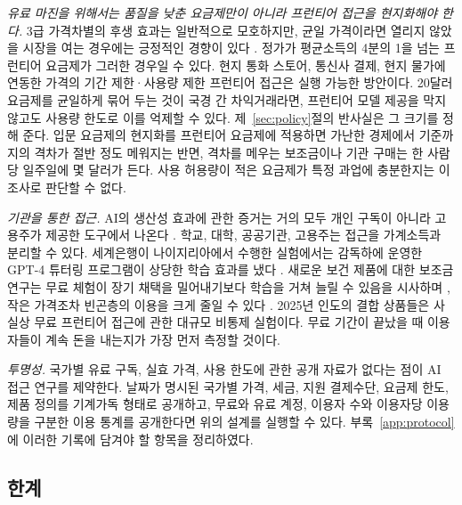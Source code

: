 \documentclass[11pt]{article}
\theoremstyle{definition}
\theoremstyle{remark}
\begin{document}
\emph{유료 마진을 위해서는 품질을 낮춘 요금제만이 아니라 프런티어 접근을 현지화해야 한다.} 3급 가격차별의 후생 효과는 일반적으로 모호하지만, 균일 가격이라면 열리지 않았을 시장을 여는 경우에는 긍정적인 경향이 있다 \citep{varian1985price,aguirre2010monopoly}. 정가가 평균소득의 4분의 1을 넘는 프런티어 요금제가 그러한 경우일 수 있다. 현지 통화 스토어, 통신사 결제, 현지 물가에 연동한 가격의 기간 제한·사용량 제한 프런티어 접근은 실행 가능한 방안이다. 20달러 요금제를 균일하게 묶어 두는 것이 국경 간 차익거래라면, 프런티어 모델 제공을 막지 않고도 사용량 한도로 이를 억제할 수 있다. 제~\ref{sec:policy}절의 반사실은 그 크기를 정해 준다. 입문 요금제의 현지화를 프런티어 요금제에 적용하면 가난한 경제에서 기준까지의 격차가 절반 정도 메워지는 반면, 격차를 메우는 보조금이나 기관 구매는 한 사람당 일주일에 몇 달러가 든다. 사용 허용량이 적은 요금제가 특정 과업에 충분한지는 이 조사로 판단할 수 없다.

\emph{기관을 통한 접근.} AI의 생산성 효과에 관한 증거는 거의 모두 개인 구독이 아니라 고용주가 제공한 도구에서 나온다 \citep{brynjolfsson2025generative,cui2024effects}. 학교, 대학, 공공기관, 고용주는 접근을 가계소득과 분리할 수 있다. 세계은행이 나이지리아에서 수행한 실험에서는 감독하에 운영한 GPT-4 튜터링 프로그램이 상당한 학습 효과를 냈다 \citep{desimone2025chalkboards}. 새로운 보건 제품에 대한 보조금 연구는 무료 체험이 장기 채택을 밀어내기보다 학습을 거쳐 늘릴 수 있음을 시사하며 \citep{dupas2014short}, 작은 가격조차 빈곤층의 이용을 크게 줄일 수 있다 \citep{cohen2010free}. 2025년 인도의 결합 상품들은 사실상 무료 프런티어 접근에 관한 대규모 비통제 실험이다. 무료 기간이 끝났을 때 이용자들이 계속 돈을 내는지가 가장 먼저 측정할 것이다.

\emph{투명성.} 국가별 유료 구독, 실효 가격, 사용 한도에 관한 공개 자료가 없다는 점이 AI 접근 연구를 제약한다. 날짜가 명시된 국가별 가격, 세금, 지원 결제수단, 요금제 한도, 제품 정의를 기계가독 형태로 공개하고, 무료와 유료 계정, 이용자 수와 이용자당 이용량을 구분한 이용 통계를 공개한다면 위의 설계를 실행할 수 있다. 부록~\ref{app:protocol}에 이러한 기록에 담겨야 할 항목을 정리하였다.

\subsection{한계}\label{sec:limitations}
\end{document}
